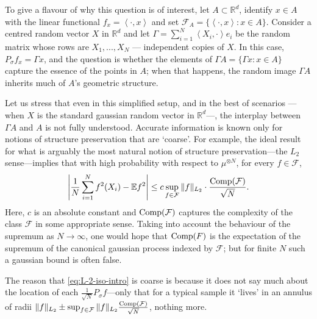 \documentclass[11pt]{amsart}
\newcommand{\R}{\mathbb{R}}
\newcommand{\inr}[1]{\left\langle #1 \right\rangle}
\theoremstyle{definition}
\newcommand{\E}{\mathbb{E}}
\numberwithin{equation}{section}
\begin{document}
To give a flavour of why this question is of interest, let $A \subset \R^d$, identify $x \in A$ with the linear functional $f_x=\inr{\cdot,x}$ and set $\mathcal{F}_A=\{\inr{\cdot,x} : x \in A\}$. 
Consider a centred random vector $X$ in $\R^d$ and let $\Gamma = \sum_{i=1}^N \inr{X_i,\cdot}e_i$ be the random matrix whose rows are $X_1,...,X_N$ --- independent copies of $X$. 
In this case,  $P_\sigma f_x = \Gamma x$, and the question is whether the elements of $\Gamma A =\{\Gamma x : x \in A\}$ capture the essence of the points in $A$; when that happens, the random image $\Gamma A$ inherits much of $A$'s geometric structure. 

Let us stress that even in this simplified setup, and in the best of scenarios --- when $X$ is the standard gaussian random vector in $\R^d$---, the interplay between $\Gamma A$ and $A$ is not fully understood. Accurate information is known only for notions of structure preservation that are `coarse'. 
For example, the ideal result for what is arguably the most natural notion of structure preservation---the $L_2$ sense---implies that with high probability with respect to $\mu^{\otimes N}$, for every $f \in \mathcal{F}$,
\begin{equation} \label{eq:L-2-iso-intro}
\left|\frac{1}{N}\sum_{i=1}^N f^2(X_i)  - \E f^2 \right| 
\leq c \sup_{f \in \mathcal{F}} \|f\|_{L_2} \cdot \frac{{\rm Comp}(\mathcal{F})}{\sqrt{N}}.
\end{equation}
Here, $c$ is an absolute constant and ${\rm Comp}(\mathcal{F})$ captures the complexity of the class $\mathcal{F}$ in some appropriate sense.
Taking into account the behaviour of the supremum as $N \to \infty$, one would hope that 
${\rm Comp}(F) $ is the expectation of the supremum of the canonical gaussian process indexed by $\mathcal{F}$; but for finite $N$ such a gaussian bound is often false.

The reason that \eqref{eq:L-2-iso-intro} is coarse is because it does not say much about the location of each $\frac{1}{\sqrt N} P_\sigma f$---only that for a typical sample it `lives' in an annulus of radii $\|f\|_{L_2} \pm  \sup_{f \in \mathcal{F}} \|f\|_{L_2}\frac{{\rm Comp}(\mathcal{F})}{\sqrt{N}}$, nothing more. 
\end{document}
